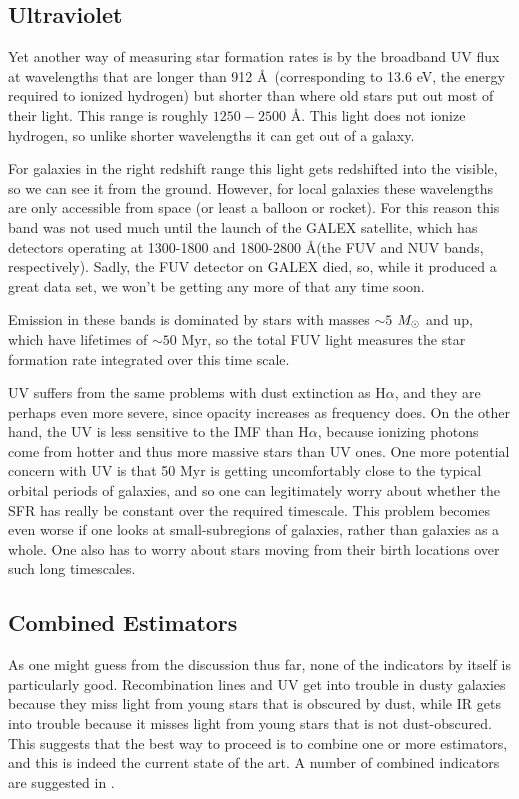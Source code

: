 \subsection{Ultraviolet}

Yet another way of measuring star formation rates is by the broadband UV flux at wavelengths that are longer than 912 \AA\ (corresponding to 13.6 eV, the energy required to ionized hydrogen) but shorter than where old stars put out most of their light. This range is roughly $1250-2500$ \AA. This light does not ionize hydrogen, so unlike shorter wavelengths it can get out of a galaxy.

For galaxies in the right redshift range this light gets redshifted into the visible, so we can see it from the ground. However, for local galaxies these wavelengths are only accessible from space (or least a balloon or rocket). For this reason this band was not used much until the launch of the GALEX satellite, which has detectors operating at 1300-1800 and 1800-2800 \AA (the FUV and NUV bands, respectively). Sadly, the FUV detector on GALEX died, so, while it produced a great data set, we won't be getting any more of that any time soon.

Emission in these bands is dominated by stars with masses $\sim 5$ $M_{\odot}$ and up, which have lifetimes of $\sim 50$ Myr, so the total FUV light measures the star formation rate integrated over this time scale. 

UV suffers from the same problems with dust extinction as H$\alpha$, and they are perhaps even more severe, since opacity increases as frequency does. On the other hand, the UV is less sensitive to the IMF than H$\alpha$, because ionizing photons come from hotter and thus more massive stars than UV ones. One more potential concern with UV is that 50 Myr is getting uncomfortably close to the typical orbital periods of galaxies, and so one can legitimately worry about whether the SFR has really be constant over the required timescale. This problem becomes even worse if one looks at small-subregions of galaxies, rather than galaxies as a whole. One also has to worry about stars moving from their birth locations over such long timescales.

\subsection{Combined Estimators}

As one might guess from the discussion thus far, none of the indicators by itself is particularly good. Recombination lines and UV get into trouble in dusty galaxies because they miss light from young stars that is obscured by dust, while IR gets into trouble because it misses light from young stars that is not dust-obscured. This suggests that the best way to proceed is to combine one or more estimators, and this is indeed the current state of the art. A number of combined indicators are suggested in \citet{kennicutt12a}.



